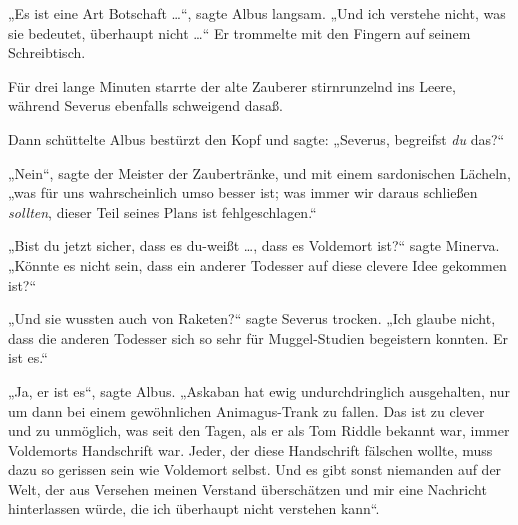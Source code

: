 „Es ist eine Art Botschaft …“, sagte Albus langsam.
„Und ich verstehe nicht, was sie bedeutet, überhaupt nicht …“ Er trommelte mit den Fingern auf seinem Schreibtisch.

Für drei lange Minuten starrte der alte Zauberer stirnrunzelnd ins Leere, während Severus ebenfalls schweigend dasaß.

Dann schüttelte Albus bestürzt den Kopf und sagte:
„Severus, begreifst \emph{du} das?“

„Nein“, sagte der Meister der Zaubertränke, und mit einem sardonischen Lächeln, „was für uns wahrscheinlich umso besser ist; was immer wir daraus schließen \emph{sollten}, dieser Teil seines Plans ist fehlgeschlagen.“

„Bist du jetzt sicher, dass es du-weißt …, dass es Voldemort ist?“ sagte Minerva.
„Könnte es nicht sein, dass ein anderer Todesser auf diese clevere Idee gekommen ist?“

„Und sie wussten auch von Raketen?“ sagte Severus trocken.
„Ich glaube nicht, dass die anderen Todesser sich so sehr für Muggel-Studien begeistern konnten. Er ist es.“

„Ja, er ist es“, sagte Albus.
„Askaban hat ewig undurchdringlich ausgehalten, nur um dann bei einem gewöhnlichen Animagus-Trank zu fallen. Das ist zu clever und zu unmöglich, was seit den Tagen, als er als Tom Riddle bekannt war, immer Voldemorts Handschrift war. Jeder, der diese Handschrift fälschen wollte, muss dazu so gerissen sein wie Voldemort selbst. Und es gibt sonst niemanden auf der Welt, der aus Versehen meinen Verstand überschätzen und mir eine Nachricht hinterlassen würde, die ich überhaupt nicht verstehen kann“.

